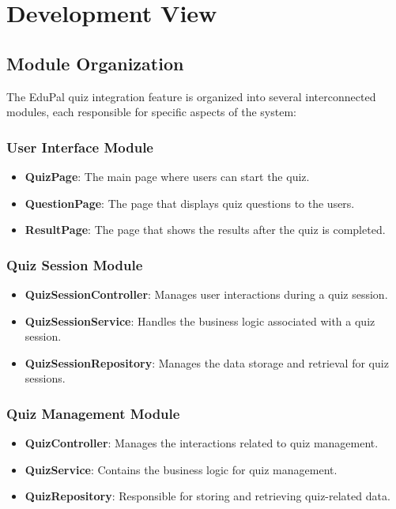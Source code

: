 \documentclass{article}
\begin{document}
\section{Development View}

\subsection{Module Organization}

The EduPal quiz integration feature is organized into several interconnected modules, each responsible for specific aspects of the system:

\subsubsection{User Interface Module}

\begin{itemize}
  \item \textbf{QuizPage}: The main page where users can start the quiz.
  \item \textbf{QuestionPage}: The page that displays quiz questions to the users.
  \item \textbf{ResultPage}: The page that shows the results after the quiz is completed.
\end{itemize}

\subsubsection{Quiz Session Module}

\begin{itemize}
  \item \textbf{QuizSessionController}: Manages user interactions during a quiz session.
  \item \textbf{QuizSessionService}: Handles the business logic associated with a quiz session.
  \item \textbf{QuizSessionRepository}: Manages the data storage and retrieval for quiz sessions.
\end{itemize}

\subsubsection{Quiz Management Module}

\begin{itemize}
  \item \textbf{QuizController}: Manages the interactions related to quiz management.
  \item \textbf{QuizService}: Contains the business logic for quiz management.
  \item \textbf{QuizRepository}: Responsible for storing and retrieving quiz-related data.
\end{itemize}
\end{document}
